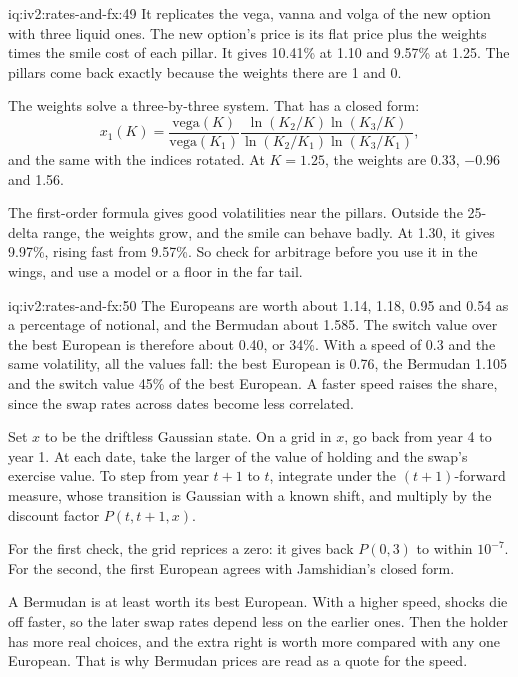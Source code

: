 \begin{solution}{iq:iv2:rates-and-fx:49}
It replicates the vega, vanna and volga of the new option with three liquid ones. The new option's price is its flat price plus the weights times the smile cost of each pillar. It gives 10.41\% at 1.10 and 9.57\% at 1.25. The pillars come back exactly because the weights there are 1 and 0.

The weights solve a three-by-three system. That has a closed form:
\[
x_1(K) = \frac{\text{vega}(K)}{\text{vega}(K_1)}\frac{\ln(K_2/K)\ln(K_3/K)}{\ln(K_2/K_1)\ln(K_3/K_1)},
\]
and the same with the indices rotated. At $K = 1.25$, the weights are 0.33, $-0.96$ and 1.56.

The first-order formula gives good volatilities near the pillars. Outside the 25-delta range, the weights grow, and the smile can behave badly. At 1.30, it gives 9.97\%, rising fast from 9.57\%. So check for arbitrage before you use it in the wings, and use a model or a floor in the far tail.

\end{solution}

\begin{solution}{iq:iv2:rates-and-fx:50}
The Europeans are worth about 1.14, 1.18, 0.95 and 0.54 as a percentage of notional, and the Bermudan about 1.585. The switch value over the best European is therefore about 0.40, or 34\%. With a speed of 0.3 and the same volatility, all the values fall: the best European is 0.76, the Bermudan 1.105 and the switch value 45\% of the best European. A faster speed raises the share, since the swap rates across dates become less correlated.

Set $x$ to be the driftless Gaussian state. On a grid in $x$, go back from year 4 to year 1. At each date, take the larger of the value of holding and the swap's exercise value. To step from year $t + 1$ to $t$, integrate under the $(t + 1)$-forward measure, whose transition is Gaussian with a known shift, and multiply by the discount factor $P(t, t + 1, x)$.

For the first check, the grid reprices a zero: it gives back $P(0, 3)$ to within $10^{-7}$. For the second, the first European agrees with Jamshidian's closed form.

A Bermudan is at least worth its best European. With a higher speed, shocks die off faster, so the later swap rates depend less on the earlier ones. Then the holder has more real choices, and the extra right is worth more compared with any one European. That is why Bermudan prices are read as a quote for the speed.

\end{solution}
